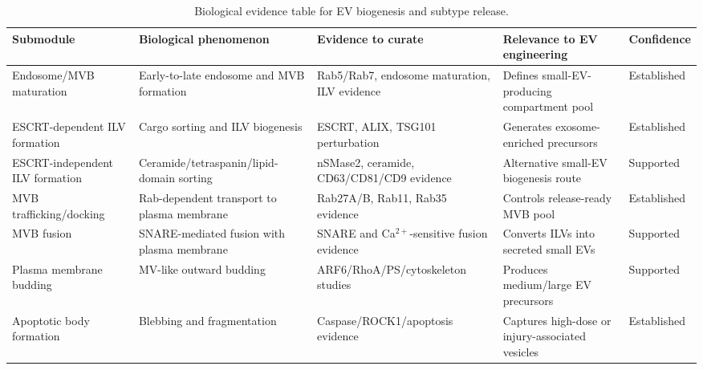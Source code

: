 \begin{table}[t]
\footnotesize\sf
\centering
\caption{Biological evidence table for EV biogenesis and subtype release.\label{T_A9_bio_ev_release}}
\begin{tabular}{p{2.7cm} p{3.4cm} p{4.2cm} p{3.0cm} p{2.0cm}}
\toprule
\textbf{Submodule} & \textbf{Biological phenomenon} & \textbf{Evidence to curate} & \textbf{Relevance to EV engineering} & \textbf{Confidence} \\
\midrule
Endosome/MVB maturation & Early-to-late endosome and MVB formation & Rab5/Rab7, endosome maturation, ILV evidence & Defines small-EV-producing compartment pool & Established \cite{ott2025coordination,borchers2023regulatory,solinger2025escrting} \\
ESCRT-dependent ILV formation & Cargo sorting and ILV biogenesis & ESCRT, ALIX, TSG101 perturbation & Generates exosome-enriched precursors & Established \cite{takahashi2015hrs,wollert2010molecular,pfitzner2020escrt,larios2020alix} \\
ESCRT-independent ILV formation & Ceramide/tetraspanin/lipid-domain sorting & nSMase2, ceramide, CD63/CD81/CD9 evidence & Alternative small-EV biogenesis route & Supported \cite{choezom2022nsmase2,crivelli2022ceramideTransfer,rubinstein2025tetraspanins} \\
MVB trafficking/docking & Rab-dependent transport to plasma membrane & Rab27A/B, Rab11, Rab35 evidence & Controls release-ready MVB pool & Established \cite{hsu2010rab35,messenger2018munc13,izumi2021rab27,tang2026rab27,marie2023accessory} \\
MVB fusion & SNARE-mediated fusion with plasma membrane & SNARE and Ca$^{2+}$-sensitive fusion evidence & Converts ILVs into secreted small EVs & Supported \cite{liu2023snare,matsui2023vamp5,woo2017munc13,courtney2023synaptotagmin7} \\
Plasma membrane budding & MV-like outward budding & ARF6/RhoA/PS/cytoskeleton studies & Produces medium/large EV precursors & Supported \cite{pang2025arf,dai2019rhoa,menck2017nsmaseMicrovesicles} \\
Apoptotic body formation & Blebbing and fragmentation & Caspase/ROCK1/apoptosis evidence & Captures high-dose or injury-associated vesicles & Established \cite{teixeira2020rock1,ozdemir2021rock1,sakamaki2025mprip} \\
\bottomrule
\end{tabular}
\end{table}

